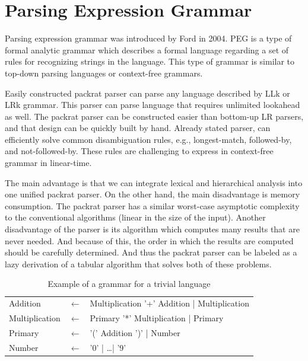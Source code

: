 \section{Parsing Expression Grammar}
Parsing expression grammar was introduced by Ford in 2004.
PEG is a type of formal analytic grammar which describes a formal language
regarding a set of rules for recognizing strings in the language. This type of
grammar is similar to top-down parsing languages or context-free grammars.

Easily constructed packrat parser can parse any language described by LLk or LRk
grammar. This parser can parse language that requires unlimited lookahead as
well. The packrat parser can be constructed easier than bottom-up LR parsers,
and that design can be quickly built by hand. Already stated parser, can
efficiently solve common disambiguation rules, e.g., longest-match, followed-by,
and not-followed-by. These rules are challenging to express in context-free
grammar in linear-time.

The main advantage is that we can integrate lexical and hierarchical analysis
into one unified packrat parser. On the other hand, the main disadvantage is
memory consumption. The packrat parser has a similar worst-case asymptotic
complexity to the conventional algorithms (linear in the size of the input).
Another disadvantage of the parser is its algorithm which computes many results
that are never needed. And because of this, the order in which the results are
computed should be carefully determined. And thus the packrat parser can be
labeled as a lazy derivation of a tabular algorithm that solves both of these
problems.

\begin{table}[h]
	\begin{center}
  \begin{tabular}{lcl}
      Addition       & $\leftarrow$ & Multiplication '+' Addition | Multiplication \\
      Multiplication & $\leftarrow$ & Primary '*' Multiplication | Primary     \\
      Primary        & $\leftarrow$ & '(' Addition ')' | Number          \\
      Number        & $\leftarrow$ & '0' | \ldots | '9'
  \end{tabular}
  \end{center}
  \caption{Example of a grammar for a trivial language}
  \label{fig:pegtl:example}
\end{table}

